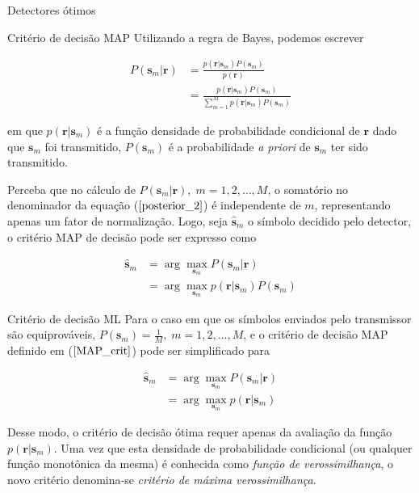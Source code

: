 \documentclass[
  ignorenonframetext,
]{beamer}
\begin{document}
\begin{frame}{Detectores ótimos}
\begin{block}{Critério de decisão MAP}
Utilizando a regra de Bayes, podemos escrever

\[
\begin{align}
P\left(\mathbf{s}_m|\mathbf{r}\right)&=\frac{p\left(\mathbf{r}|\mathbf{s}_m\right) P\left(\mathbf{s}_m\right)}{p(\mathbf{r})}\nonumber\\
&= \frac{p\left(\mathbf{r}|\mathbf{s}_m\right) P\left(\mathbf{s}_m\right)}{\sum_{m=1}^M p\left(\mathbf{r}|\mathbf{s}_m\right) P\left(\mathbf{s}_m\right)}\label{posterior_2}
\end{align}
\]

em que \(p\left(\mathbf{r}|\mathbf{s}_m\right)\) é a função densidade de
probabilidade condicional de \(\mathbf{r}\) dado que \(\mathbf{s}_m\)
foi transmitido, \(P\left(\mathbf{s}_m\right)\) é a probabilidade
\emph{a priori} de \(\mathbf{s}_m\) ter sido transmitido.

Perceba que no cálculo de
\(P\left(\mathbf{s}_m|\mathbf{r}\right),\; m=1,2, \ldots, M\), o
somatório no denominador da equação (\(\ref{posterior_2}\)) é
independente de \(m\), representando apenas um fator de normalização.
Logo, seja \(\hat{\mathbf{s}}_m\) o símbolo decidido pelo detector, o
critério MAP de decisão pode ser expresso como

\[
\begin{align}
\hat{\mathbf{s}}_m &= \arg\max_{\mathbf{s}_m}P\left(\mathbf{s}_m|\mathbf{r}\right)\nonumber\\
&= \arg\max_{\mathbf{s}_m}p\left(\mathbf{r}|\mathbf{s}_m\right)P\left(\mathbf{s}_m\right)\label{MAP_crit}
\end{align}
\]
\end{block}

\begin{block}{Critério de decisão ML}
\label{crituxe9rio-de-decisuxe3o-ml}
Para o caso em que os símbolos enviados pelo transmissor são
equiprováveis,
\(P\left(\mathbf{s}_m\right) = \frac{1}{M},\; m=1,2, \ldots, M\), e o
critério de decisão MAP definido em (\(\ref{MAP_crit}\)) pode ser
simplificado para

\[
\begin{align}
\hat{\mathbf{s}}_m &= \arg\max_{\mathbf{s}_m}P\left(\mathbf{s}_m|\mathbf{r}\right)\nonumber\\
&= \arg\max_{\mathbf{s}_m}p\left(\mathbf{r}|\mathbf{s}_m\right)\label{ML_crit}
\end{align}
\]

Desse modo, o critério de decisão ótima requer apenas da avaliação da
função \(p\left(\mathbf{r}|\mathbf{s}_m\right)\). Uma vez que esta
densidade de probabilidade condicional (ou qualquer função monotônica da
mesma) é conhecida como \emph{função de verossimilhança}, o novo
critério denomina-se \emph{critério de máxima verossimilhança}.
\end{block}


\end{frame}
\end{document}

